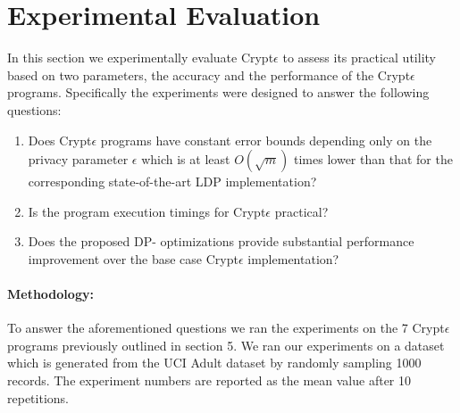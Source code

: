 \section{Experimental Evaluation}
In this section we experimentally evaluate  Crypt$\epsilon$ to assess its practical utility  based on two parameters, the accuracy and the performance of the Crypt$\epsilon$ programs. Specifically the experiments were designed to answer the following questions:
\begin{enumerate}\item Does Crypt$\epsilon$ programs have constant error bounds depending only on the privacy parameter $\epsilon$  which is at least $O(\sqrt{m})$ times lower than that for the corresponding state-of-the-art LDP implementation? \item Is the program execution timings for Crypt$\epsilon$ practical? \item Does the proposed DP- optimizations provide substantial performance improvement over the base case Crypt$\epsilon$ implementation? \end{enumerate}

\paragraph{Methodology:} To answer the aforementioned questions we ran the experiments on the 7 Crypt$\epsilon$ programs previously outlined in section 5. We ran our experiments on a dataset which is generated from the UCI Adult dataset by randomly sampling 1000 records. The experiment numbers are reported as the mean value after 10 repetitions.
